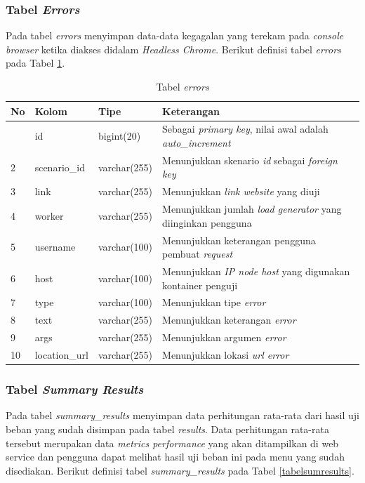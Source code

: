 			\subsubsection{Tabel \textit{Errors}}
				Pada tabel \textit{errors} menyimpan data-data kegagalan yang terekam pada \textit{console browser} ketika diakses didalam \textit{Headless Chrome}. Berikut definisi tabel \textit{errors} pada Tabel \ref{tabelerrors}.
				
				\begin{longtable}{|p{}|p{}|p{}|p{}|}
					\caption{Tabel \textit{errors}} \label{tabelerrors} \\
					\hline
					\textbf{No} & \textbf{Kolom} & \textbf{Tipe} & \textbf{Keterangan} \\ \hline
					\endhead
					\endfoot
					\endlastfoot
					1 & id & bigint(20) & Sebagai \textit{primary key}, nilai awal adalah \textit{auto\_increment} \\ \hline
					2 & scenario\_id & varchar(255) & Menunjukkan skenario \textit{id} sebagai \textit{foreign key} \\ \hline
					3 & link & varchar(255) & Menunjukkan \textit{link website} yang diuji \\ \hline
					4 & worker & varchar(255) & Menunjukkan jumlah \textit{load generator} yang diinginkan pengguna \\ \hline
					5 & username & varchar(100) & Menunjukkan keterangan pengguna pembuat \textit{request} \\ \hline
					6 & host & varchar(100) & Menunjukkan \textit{IP node host} yang digunakan kontainer penguji \\ \hline
					7 & type & varchar(100) & Menunjukkan tipe \textit{error} \\ \hline
					8 & text & varchar(255) & Menunjukkan keterangan \textit{error} \\ \hline
					9 & args & varchar(255) & Menunjukkan argumen \textit{error} \\ \hline
					10 & location\_url & varchar(255) & Menunjukkan lokasi \textit{url error} \\ \hline
				\end{longtable}
		
			\subsubsection{Tabel \textit{Summary Results}}
				Pada tabel \textit{summary\_results} menyimpan data perhitungan rata-rata dari hasil uji beban yang sudah disimpan pada tabel \textit{results}. Data perhitungan rata-rata tersebut merupakan data \textit{metrics performance} yang akan ditampilkan di web service dan pengguna dapat melihat hasil uji beban ini pada menu yang sudah disediakan. Berikut definisi tabel \textit{summary\_results} pada Tabel \ref{tabelsumresults}.
			
